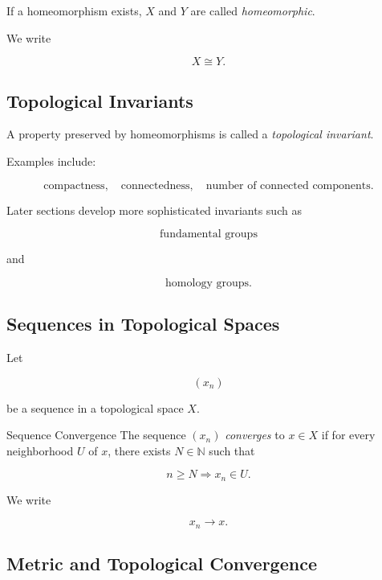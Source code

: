 If a homeomorphism exists, \(X\) and \(Y\) are called
\emph{homeomorphic}.

We write

\[
\boxed{
X\cong Y.
}
\]

\subsection{Topological Invariants}
\label{subsec:topological-invariants}

A property preserved by homeomorphisms is called a
\emph{topological invariant}.

Examples include:

\[
\boxed{
\text{compactness},
\quad
\text{connectedness},
\quad
\text{number of connected components}.
}
\]

Later sections develop more sophisticated invariants such as

\[
\boxed{
\text{fundamental groups}
}
\]

and

\[
\boxed{
\text{homology groups}.
}
\]

\subsection{Sequences in Topological Spaces}
\label{subsec:topological-sequences}

Let

\[
(x_n)
\]

be a sequence in a topological space \(X\).

\begin{definitionbox}{Sequence Convergence}
The sequence \((x_n)\) \emph{converges} to \(x\in X\) if for every
neighborhood \(U\) of \(x\), there exists \(N\in\mathbb{N}\) such that

\[
\boxed{
n\geq N
\Longrightarrow
x_n\in U.
}
\]
\end{definitionbox}

We write

\[
\boxed{
x_n\to x.
}
\]

\subsection{Metric and Topological Convergence}
\label{subsec:metric-topological-convergence}

